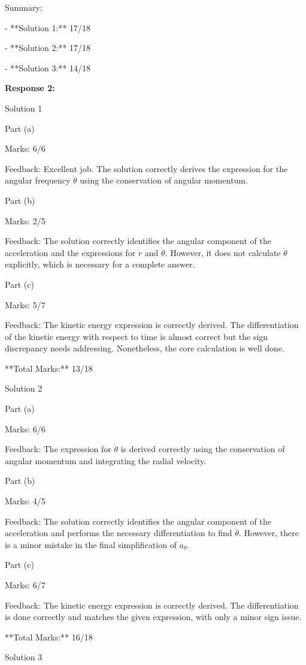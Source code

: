 \documentclass[a4paper,11pt]{article}
\begin{document}
Summary:

- **Solution 1:** 17/18

- **Solution 2:** 17/18

- **Solution 3:** 14/18

\bigskip
\textbf{Response 2:}

Solution 1

Part (a)

Marks: 6/6

Feedback: Excellent job. The solution correctly derives the expression for the angular frequency \(\dot{\theta}\) using the conservation of angular momentum.

Part (b)

Marks: 2/5

Feedback: The solution correctly identifies the angular component of the acceleration and the expressions for \(\dot{r}\) and \(\dot{\theta}\). However, it does not calculate \(\ddot{\theta}\) explicitly, which is necessary for a complete answer.

Part (c)

Marks: 5/7

Feedback: The kinetic energy expression is correctly derived. The differentiation of the kinetic energy with respect to time is almost correct but the sign discrepancy needs addressing. Nonetheless, the core calculation is well done.

**Total Marks:** 13/18

Solution 2

Part (a)

Marks: 6/6

Feedback: The expression for \(\dot{\theta}\) is derived correctly using the conservation of angular momentum and integrating the radial velocity.

Part (b)

Marks: 4/5

Feedback: The solution correctly identifies the angular component of the acceleration and performs the necessary differentiation to find \(\ddot{\theta}\). However, there is a minor mistake in the final simplification of \(a_{\theta}\).

Part (c)

Marks: 6/7

Feedback: The kinetic energy expression is correctly derived. The differentiation is done correctly and matches the given expression, with only a minor sign issue.

**Total Marks:** 16/18

Solution 3
\end{document}

